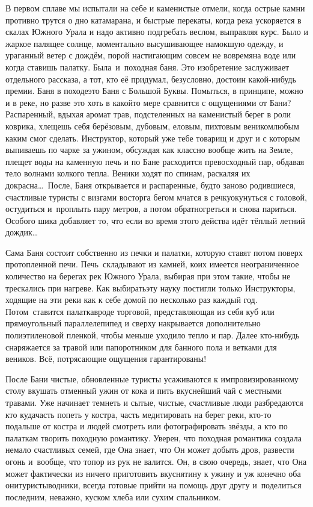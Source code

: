 В первом сплаве мы испытали на себе и каменистые отмели, когда острые камни противно трутся о дно катамарана, и быстрые перекаты, когда река ускоряется в скалах Южного Урала и надо активно подгребать веслом, выправляя курс. Было и жаркое палящее солнце, моментально высушивающее намокшую одежду, и ураганный ветер с дождём, порой настигающим совсем не вовремя\mdash на воде или когда ставишь палатку. Была~и~походная баня. Это изобретение заслуживает отдельного рассказа, а тот, кто её придумал, безусловно, достоин какой-нибудь премии.
\newpage
Баня в походе\mdash это Баня с Большой Буквы. Помыться, в принципе, можно и в реке, но разве это хоть в какой\sdash то мере сравнится с ощущениями от Бани? Распаренный, вдыхая аромат трав, подстеленных на каменистый берег в роли коврика, хлещешь себя берёзовым, дубовым, еловым, пихтовым веником\mdash любым каким смог сделать. Инструктор, который уже тебе товарищ и друг и с которым выпиваешь по чарке за ужином, обсуждая как классно вообще жить на Земле, плещет воды на каменную печь и по Бане расходится превосходный пар, обдавая тело волнами колкого тепла. Веники ходят по спинам, раскаляя их докрасна\ldots~После, Баня открывается и распаренные, будто заново родившиеся, счастливые туристы с визгами восторга бегом мчатся в речку\mdash окунуться с головой, остудиться и~проплыть пару метров, а потом обратно\mdash греться и снова париться. Особого шика добавляет то, что если во время этого действа идёт тёплый летний дождик\ldots  

Сама Баня состоит собственно из печки и палатки, которую ставят потом поверх протопленной печи. Печь~складывают из камней, коих имеется неограниченное количество на берегах рек Южного Урала, выбирая при этом такие, чтобы не трескались при нагреве. Как выбирать\mdash эту науку постигли только Инструкторы, ходящие на эти реки как к себе домой по несколько раз каждый год. Потом~ставится палатка\mdash вроде торговой, представляющая из себя куб или прямоугольный параллелепипед и сверху накрывается дополнительно полиэтиленовой пленкой, чтобы меньше уходило тепло и пар. Далее кто-нибудь снаряжается за травой или папоротником для банного пола и ветками для веников. Всё, потрясающие ощущения гарантированы!

После Бани чистые, обновленные туристы усаживаются к импровизированному столу вкушать отменный ужин от кока и пить вкуснейший чай с местными травами. Уже начинает темнеть и сытые, чистые, счастливые люди разбредаются кто куда\mdash часть попеть у костра, часть медитировать на берег реки, кто-то подальше от костра и людей смотреть или фотографировать звёзды, а кто по палаткам творить походную романтику. Уверен, что походная романтика создала немало счастливых семей, где Она знает, что Он может добыть дров, развести огонь и~вообще, что топор из рук не валится. Он, в свою очередь, знает, что Она может фактически из ничего приготовить вкуснятину к ужину и уж конечно оба они\mdash туристы\sdash водники, всегда готовые прийти на помощь друг другу и~поделиться последним, неважно, куском хлеба или сухим спальником. 

